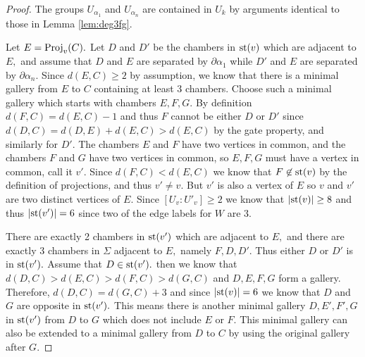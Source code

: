 \documentclass[class=book, crop=false]{standalone}
\begin{document}
\begin{proof}
	The groups $U_{\alpha_1}$ and $U_{\alpha_n}$ are contained in $U_k$ by arguments identical to those in Lemma \ref{lem:deg3fg}.

	Let $E=\mathrm{Proj}_v(C).$ Let $D$ and $D'$ be the chambers in $\mathrm{st}(v)$ which are adjacent to $E,$ and assume that $D$ and $E$ are separated by $\partial\alpha_1$ while $D'$ and $E$ are separated by $\partial\alpha_n.$ Since $d(E,C)\ge 2$ by assumption, we know that there is a minimal gallery from $E$ to $C$ containing at least 3 chambers. Choose such a minimal gallery which starts with chambers $E,F,G.$ By definition $d(F,C)=d(E,C)-1$ and thus $F$ cannot be either $D$ or $D'$ since $d(D,C)=d(D,E)+d(E,C)>d(E,C)$ by the gate property, and similarly for $D'.$ The chambers $E$ and $F$ have two vertices in common, and the chambers $F$ and $G$ have two vertices in common, so $E,F,G$ must have a vertex in common, call it $v'.$ Since $d(F,C)<d(E,C)$ we know that $F\not\in \mathrm{st}(v)$ by the definition of projections, and thus $v'\neq v.$ But $v'$ is also a vertex of $E$ so $v$ and $v'$ are two distinct vertices of $E.$ Since $[U_v:U'_v]\ge 2$ we know that $|\mathrm{st}(v)|\ge 8$ and thus $|\mathrm{st}(v')|=6$ since two of the edge labels for $W$ are 3.

	There are exactly 2 chambers in $\mathrm{st}(v')$ which are adjacent to $E,$ and there are exactly 3 chambers in $\Sigma$ adjacent to $E,$ namely $F,D,D'.$ Thus either $D$ or $D'$ is in $\mathrm{st}(v').$ Assume that $D\in \mathrm{st}(v').$ then we know that $d(D,C)>d(E,C)>d(F,C)>d(G,C)$ and $D,E,F,G$ form a gallery. Therefore, $d(D,C)=d(G,C)+3$ and since $|\mathrm{st}(v)|=6$ we know that $D$ and $G$ are opposite in $\mathrm{st}(v').$ This means there is another minimal gallery $D,E',F',G$ in $\mathrm{st}(v')$ from $D$ to $G$ which does not include $E$ or $F.$ This minimal gallery can also be extended to a minimal gallery from $D$ to $C$ by using the original gallery after $G.$


\end{proof}
\end{document}
